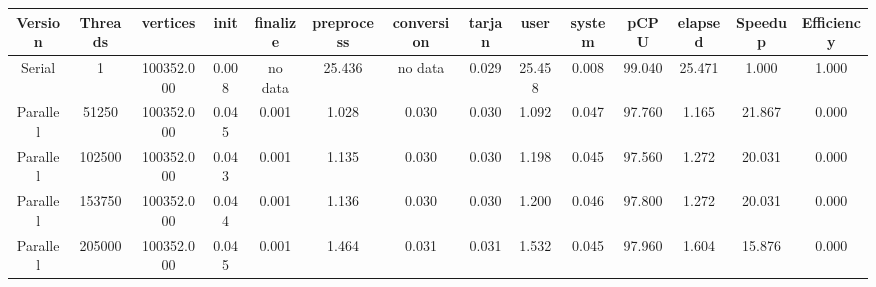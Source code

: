 \begin{tabular}{|c|c|c|c|c|c|c|c|c|c|c|c|c|c|}
\toprule
 Version &  Threads &   vertices &  init & finalize &  preprocess & conversion &  tarjan &   user &  system &   pCPU &  elapsed &  Speedup &  Efficiency \\
\midrule
  Serial &        1 & 100352.000 & 0.008 &  no data &      25.436 &    no data &   0.029 & 25.458 &   0.008 & 99.040 &   25.471 &    1.000 &       1.000 \\
Parallel &    51250 & 100352.000 & 0.045 &    0.001 &       1.028 &      0.030 &   0.030 &  1.092 &   0.047 & 97.760 &    1.165 &   21.867 &       0.000 \\
Parallel &   102500 & 100352.000 & 0.043 &    0.001 &       1.135 &      0.030 &   0.030 &  1.198 &   0.045 & 97.560 &    1.272 &   20.031 &       0.000 \\
Parallel &   153750 & 100352.000 & 0.044 &    0.001 &       1.136 &      0.030 &   0.030 &  1.200 &   0.046 & 97.800 &    1.272 &   20.031 &       0.000 \\
Parallel &   205000 & 100352.000 & 0.045 &    0.001 &       1.464 &      0.031 &   0.031 &  1.532 &   0.045 & 97.960 &    1.604 &   15.876 &       0.000 \\
\bottomrule
\end{tabular}
